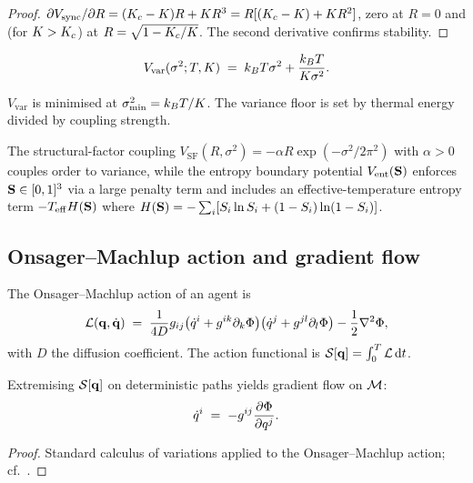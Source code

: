 \begin{proof}
$\partial V_{\mathrm{sync}}/\partial R=(K_c-K)R+KR^3=R[(K_c-K)+KR^2]$,
zero at $R=0$ and (for $K>K_c$) at $R=\sqrt{1-K_c/K}$. The second
derivative confirms stability.
\end{proof}

\begin{definition}\label{def:vvar}
\[
V_{\mathrm{var}}(\sigma^2;T,K)\;=\;k_B T\sigma^2+\frac{k_B T}{K\sigma^2}.
\]
\end{definition}

\begin{proposition}\label{prop:varfloor}
$V_{\mathrm{var}}$ is minimised at $\sigma^2_{\min}=k_B T/K$. The variance
floor is set by thermal energy divided by coupling strength.
\end{proposition}

The structural-factor coupling
$V_{\mathrm{SF}}(R,\sigma^2)=-\alpha R\exp(-\sigma^2/2\pi^2)$ with
$\alpha>0$ couples order to variance, while the entropy boundary potential
$V_{\mathrm{ent}}(\mathbf{S})$ enforces $\mathbf{S}\in[0,1]^3$ via a large penalty
term and includes an effective-temperature entropy term $-T_{\mathrm{eff}}H(\mathbf{S})$
where $H(\mathbf{S})=-\sum_i[S_i\ln S_i+(1-S_i)\ln(1-S_i)]$.

\subsection{Onsager--Machlup action and gradient flow}

\begin{definition}\label{def:action}
The Onsager--Machlup action of an agent is
\[
\mathcal{L}(\mathbf{q},\dot{\mathbf{q}})\;=\;
\frac{1}{4D}g_{ij}\bigl(\dot q^i+g^{ik}\partial_k\Phi\bigr)
                   \bigl(\dot q^j+g^{jl}\partial_l\Phi\bigr)
-\frac{1}{2}\nabla^2\Phi,
\]
with $D$ the diffusion coefficient. The action functional is
$\mathcal{S}[\mathbf{q}]=\int_0^T\mathcal{L}\,\mathrm{d}t$.
\end{definition}

\begin{theorem}\label{thm:gradflow}
Extremising $\mathcal{S}[\mathbf{q}]$ on deterministic paths yields gradient
flow on $\mathcal{M}$:
\[
\dot q^i\;=\;-g^{ij}\frac{\partial\Phi}{\partial q^j}.
\]
\end{theorem}

\begin{proof}
Standard calculus of variations applied to the Onsager--Machlup action;
cf.\ \citep{onsager1953,machlup1953}.
\end{proof}

